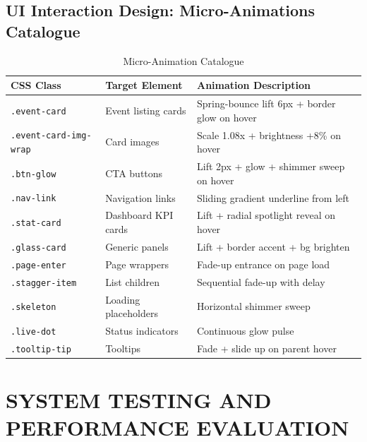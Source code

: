 \documentclass[12pt,a4paper]{report}
\begin{document}
\section{UI Interaction Design: Micro-Animations Catalogue}

\begin{table}[H]
    \centering
    \caption{Micro-Animation Catalogue}
    \vspace{0.2cm}
    \begin{tabular}{|p{3.5cm}|p{4.5cm}|p{5.5cm}|}
        \hline
        \textbf{CSS Class} & \textbf{Target Element} & \textbf{Animation Description} \\
        \hline
        \texttt{.event-card} & Event listing cards & Spring-bounce lift 6px + border glow on hover \\
        \hline
        \texttt{.event-card-img-wrap} & Card images & Scale 1.08x + brightness +8\% on hover \\
        \hline
        \texttt{.btn-glow} & CTA buttons & Lift 2px + glow + shimmer sweep on hover \\
        \hline
        \texttt{.nav-link} & Navigation links & Sliding gradient underline from left \\
        \hline
        \texttt{.stat-card} & Dashboard KPI cards & Lift + radial spotlight reveal on hover \\
        \hline
        \texttt{.glass-card} & Generic panels & Lift + border accent + bg brighten \\
        \hline
        \texttt{.page-enter} & Page wrappers & Fade-up entrance on page load \\
        \hline
        \texttt{.stagger-item} & List children & Sequential fade-up with delay \\
        \hline
        \texttt{.skeleton} & Loading placeholders & Horizontal shimmer sweep \\
        \hline
        \texttt{.live-dot} & Status indicators & Continuous glow pulse \\
        \hline
        \texttt{.tooltip-tip} & Tooltips & Fade + slide up on parent hover \\
        \hline
    \end{tabular}
\end{table}
\chapter{SYSTEM TESTING AND PERFORMANCE EVALUATION}
\end{document}
